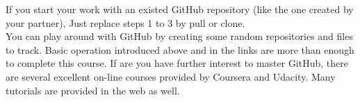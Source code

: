 \documentclass[12pt, fullpage,letterpaper]{article}
\begin{document}
If you start your work with an existed GitHub repository (like  the one created by your partner), Just replace steps 1 to 3 by pull or clone. \\

You can play around with GitHub by creating some random  repositories and files to track. 
Basic operation introduced above and in the links are more than enough to complete this course. If are you have further interest to master GitHub, there are several excellent on-line courses provided by Coursera and Udacity. Many tutorials are provided in the web as well. 
\end{document}
